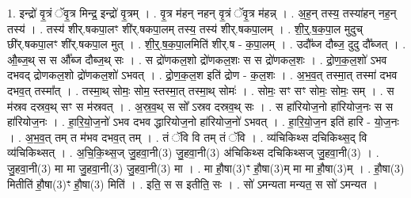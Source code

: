 \documentclass[17pt]{extarticle}
\begin{document}
1. इन्द्रो॑ वृ॒त्रं ॅवृ॒त्र मिन्द्र॒ इन्द्रो॑ वृ॒त्रम् । . वृ॒त्र म॑हन् नहन् वृ॒त्रं ॅवृ॒त्र म॑हन्न् । . अ॒ह॒न् तस्य॒ तस्या॑हन् नह॒न् तस्य॑ । . तस्य॑ शीर्.षकपा॒लꣳ शी॑र्.षकपा॒लम् तस्य॒ तस्य॑ शीर्.षकपा॒लम् । . शी॒र्॒.ष॒क॒पा॒ल मुदुच् छी॑र्.षकपा॒लꣳ शी॑र्.षकपा॒ल मुत् । . शी॒र्॒.ष॒क॒पा॒लमिति॑ शीर्.ष - क॒पा॒लम् । . उदौ᳚ब्ज दौब्ज॒ दुदु दौ᳚ब्जत् । . औ॒ब्ज॒थ् स स औ᳚ब्ज दौब्ज॒थ् सः । . स द्रो॑णकल॒शो द्रो॑णकल॒शः स स द्रो॑णकल॒शः । . द्रो॒ण॒क॒ल॒शो॑ ऽभव दभवद् द्रोणकल॒शो द्रो॑णकल॒शो॑ ऽभवत् । . द्रो॒ण॒क॒ल॒श इति॑ द्रोण - क॒ल॒शः । . अ॒भ॒व॒त् तस्मा॒त् तस्मा॑ दभव दभव॒त् तस्मा᳚त् । . तस्मा॒थ् सोमः॒ सोम॒ स्तस्मा॒त् तस्मा॒थ् सोमः॑ । . सोमः॒ सꣳ सꣳ सोमः॒ सोमः॒ सम् । . स म॑स्रव दस्रव॒थ् सꣳ स म॑स्रवत् । . अ॒स्र॒व॒थ् स सो᳚ ऽस्रव दस्रव॒थ् सः । . स हा॑रियोज॒नो हा॑रियोज॒नः स स हा॑रियोज॒नः । . हा॒रि॒यो॒ज॒नो॑ ऽभव दभव द्धारियोज॒नो हा॑रियोज॒नो॑ ऽभवत् । . हा॒रि॒यो॒ज॒न इति॑ हारि - यो॒ज॒नः । . अ॒भ॒व॒त् तम् त म॑भव दभव॒त् तम् । . तं ॅवि वि तम् तं ॅवि । . व्य॑चिकिथ्स दचिकिथ्स॒द् वि व्य॑चिकिथ्सत् । . अ॒चि॒कि॒थ्स॒ज् जु॒हवा॒नी(3) जु॒हवा॒नी(3) अ॑चिकिथ्स दचिकिथ्सज् जु॒हवा॒नी(3) । . जु॒हवा॒नी(3) मा मा जु॒हवा॒नी(3) जु॒हवा॒नी(3) मा । . मा हौ॒षा(3)ꣳ हौ॒षा(3)म् मा मा हौ॒षा(3)म् । . हौ॒षा(3) मितीति॑ हौ॒षा(3)ꣳ हौ॒षा(3) मिति॑ । . इति॒ स स इतीति॒ सः । . सो॑ ऽमन्यता मन्यत॒ स सो॑ ऽमन्यत । \newline
\end{document}
